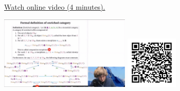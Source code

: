 
\begin{minipage}{10cm}
    \href{https://act4e-spring21.netlify.app/videos/spring2021-enrichment:enrich-cat-def.html}{Watch online video (4 minutes).}
        
    \href{https://act4e-spring21.netlify.app/videos/spring2021-enrichment:enrich-cat-def.html}{\includegraphics[height=3.5cm]{spring2021-enrichment:enrich-cat-def/thumbnails.jpg}}
    \href{https://act4e-spring21.netlify.app/videos/spring2021-enrichment:enrich-cat-def.html}{\includegraphics[height=2.5cm]{spring2021-enrichment:enrich-cat-def/qrcode.png}}
\end{minipage}
